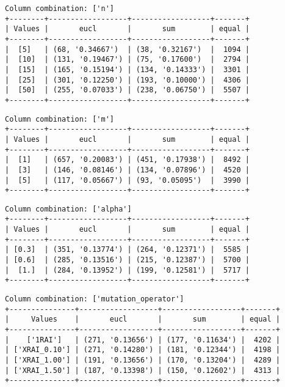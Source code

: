 \documentclass{article}
\begin{document}
\begin{verbatim}
Column combination: ['n']
+--------+------------------+------------------+-------+
| Values |       eucl       |       sum        | equal |
+--------+------------------+------------------+-------+
|  [5]   | (68, '0.34667')  | (38, '0.32167')  |  1094 |
|  [10]  | (131, '0.19467') | (75, '0.17600')  |  2794 |
|  [15]  | (165, '0.15194') | (134, '0.14333') |  3301 |
|  [25]  | (301, '0.12250') | (193, '0.10000') |  4306 |
|  [50]  | (255, '0.07033') | (238, '0.06750') |  5507 |
+--------+------------------+------------------+-------+
\end{verbatim}

\begin{verbatim}
Column combination: ['m']
+--------+------------------+------------------+-------+
| Values |       eucl       |       sum        | equal |
+--------+------------------+------------------+-------+
|  [1]   | (657, '0.20083') | (451, '0.17938') |  8492 |
|  [3]   | (146, '0.08146') | (134, '0.07896') |  4520 |
|  [5]   | (117, '0.05667') | (93, '0.05095')  |  3990 |
+--------+------------------+------------------+-------+
\end{verbatim}

\begin{verbatim}
Column combination: ['alpha']
+--------+------------------+------------------+-------+
| Values |       eucl       |       sum        | equal |
+--------+------------------+------------------+-------+
| [0.3]  | (351, '0.13774') | (264, '0.12371') |  5585 |
| [0.6]  | (285, '0.13516') | (215, '0.12387') |  5700 |
|  [1.]  | (284, '0.13952') | (199, '0.12581') |  5717 |
+--------+------------------+------------------+-------+
\end{verbatim}

\begin{verbatim}
Column combination: ['mutation_operator']
+---------------+------------------+------------------+-------+
|     Values    |       eucl       |       sum        | equal |
+---------------+------------------+------------------+-------+
|    ['1RAI']   | (271, '0.13656') | (177, '0.11634') |  4202 |
| ['XRAI_0.10'] | (271, '0.14280') | (181, '0.12344') |  4198 |
| ['XRAI_1.00'] | (191, '0.13656') | (170, '0.13204') |  4289 |
| ['XRAI_1.50'] | (187, '0.13398') | (150, '0.12602') |  4313 |
+---------------+------------------+------------------+-------+
\end{verbatim}
\end{document}

